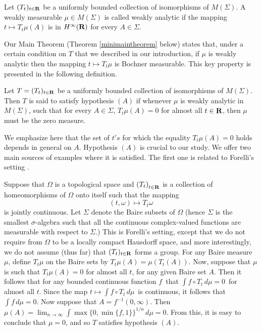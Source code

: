 \begin{weakanalytic}
Let $(T_t)_{t\in\R}$ be a  
uniformly bounded collection of 
isomorphisms of $M(\Sigma)$.  
A weakly measurable $\mu\in M(\Sigma)$ is 
called weakly analytic if the mapping $t\mapsto T_t\mu(A)$ 
is in $H^\infty(\R)$ for every $A\in\Sigma$.\\
\label{weakanalytic}
\end{weakanalytic}
Our Main Theorem (Theorem \ref{minimaintheorem} below) 
states that, under a certain condition on $T$
that we described in our introduction, if
$\mu$ is weakly analytic then the mapping
$t\mapsto T_t\mu$ is Bochner measurable.  This key property
is presented in the following definition.
\begin{hypA}
Let $T=(T_t)_{t\in\R}$ be a  
uniformly bounded collection of 
isomorphisms of $M(\Sigma)$. 
Then $T$ is said   
to satisfy hypothesis $(A)$ if whenever $\mu$ is weakly analytic
in $M(\Sigma)$, such that for every $A\in \Sigma$,  
$T_t\mu(A)=0$ for almost all
$t\in \R$, then $\mu$ must be the zero measure.
\label{hypA}
\end{hypA}
We emphasize here that the set of $t's$ for which the equality
$T_t\mu(A)=0$ holds depends in general on $A$.  
Hypothesis $(A)$ is crucial to our
study.  
We offer two main sources of examples where it is satisfied.  
The first one 
is related to Forelli's
setting \cite{forelli}.
\begin{ex1}
{\rm Suppose that $\Omega$ is a topological 
space and $\left( T_t\right)_{t\in\R}$ is a collection 
of homeomorphisms of $\Omega$ onto itself 
such that the mapping
$$(t,\omega)\mapsto T_t\omega$$
is jointly continuous.  Let $\Sigma$ denote the 
Baire subsets of $\Omega$
(hence $\Sigma$ is the smallest 
$\sigma$-algebra such that all   
the continuous complex-valued functions 
are measurable with respect to $\Sigma$.)  This 
is Forelli's setting, except that we 
do not require from $\Omega$ to be a locally compact 
Hausdorff space, and more interestingly, we 
do not assume (thus far) that $(T_t)_{t\in\R}$ forms a group.  
For any Baire measure $\mu$, define $T_t\mu$ on the Baire
sets by $T_t\mu(A)=\mu(T_t(A))$.  
Now, suppose that
$\mu$ is such that $T_t\mu(A)=0$ for almost all
$t$, for any given Baire set $A$.  Then it follows that for any
bounded continuous function $f$\ that
$\int f\circ T_t \,d\mu = 0$\ for almost all $t$.  Since
the map $t\mapsto \int f\circ T_t \,d\mu$\ is continuous, it follows
that $\int f\,d\mu = 0$.  Now suppose that $A = f^{-1}(0,\infty)$.  Then
$\mu(A) = \lim_{n\to\infty} \int\max\{0,\min\{f,1\}\}^{1/n} \, d\mu = 0$.
From this, it is easy to conclude that $\mu = 0$, and so
$T$ satisfies hypothesis $(A)$}.
\label{ex1}
\end{ex1}
